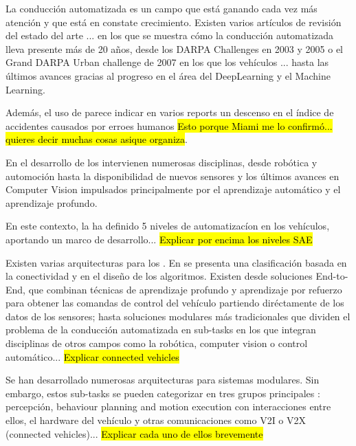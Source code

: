 
La conducción automatizada es un campo que está ganando cada vez más atención y que está en constate crecimiento. Existen varios artículos de revisión del estado del arte \cite{survey_AutomatedDriving1} \cite{survey_AutomatedDriving2}... en los que se muestra cómo la conducción automatizada lleva presente más de 20 años, desde los DARPA Challenges en 2003 y 2005 o el Grand DARPA Urban challenge de 2007 en los que los vehículos ... hasta las últimos avances gracias al progreso en el área del DeepLearning y el Machine Learning.

Además, el uso de  parece indicar en varios reports un descenso en el índice de accidentes causados por erroes humanos \hl{Esto porque Miami me lo confirmó... quieres decir muchas cosas asique organiza}.

En el desarrollo de los  intervienen numerosas disciplinas, desde robótica y automoción hasta la disponibilidad de nuevos sensores y los últimos avances en Computer Vision impulsados principalmente por el aprendizaje automático y el aprendizaje profundo.

En este contexto, la  ha definido 5 niveles de automatizacíon en los vehículos, aportando un marco de desarrollo... \hl{Explicar por encima los niveles SAE}

Existen varias arquitecturas para los . En \cite{survey_AutomatedDriving1} se presenta una clasificación basada en la conectividad y en el diseño de los algoritmos. Existen desde soluciones End-to-End, que combinan técnicas de aprendizaje profundo y aprendizaje por refuerzo para obtener las comandas de control del vehículo partiendo diréctamente de los datos de los sensores; hasta soluciones modulares más tradicionales que dividen el problema de la conducción automatizada en sub-tasks en los que integran disciplinas de otros campos como la robótica, computer vision o control automático...  \hl{Explicar connected vehicles}

Se han desarrollado numerosas arquitecturas para sistemas  modulares. Sin embargo, estos sub-tasks se pueden categorizar en tres grupos principales \cite{machines5010006}: percepción, behaviour planning and motion execution con interacciones entre ellos, el hardware del vehículo y otras comunicaciones como V2I o V2X (connected vehicles)... \hl{Explicar cada uno de ellos brevemente}






